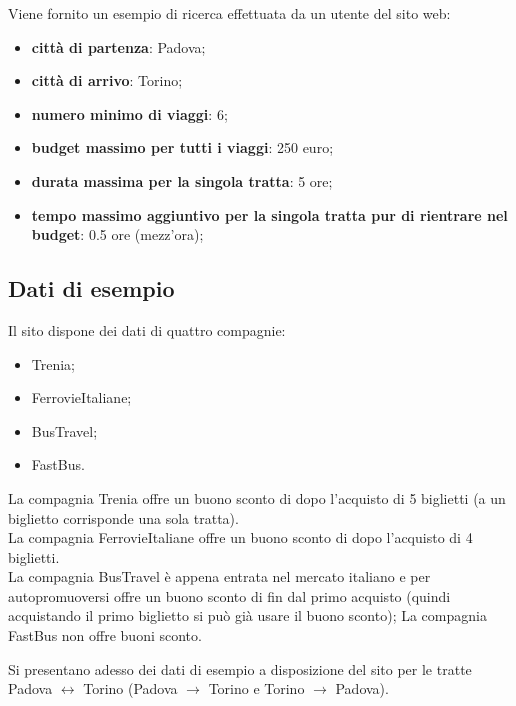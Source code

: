 \documentclass[main.tex]{subfiles}
\begin{document}
Viene fornito un esempio di ricerca effettuata da un utente del sito web:
\begin{itemize}
    \item \textbf{città di partenza}: Padova;
    \item \textbf{città di arrivo}: Torino;
    \item \textbf{numero minimo di viaggi}: 6;
    \item \textbf{budget massimo per tutti i viaggi}: 250 euro;
    \item \textbf{durata massima per la singola tratta}: 5 ore;
    \item \textbf{tempo massimo aggiuntivo per la singola tratta pur di rientrare nel budget}: 0.5 ore (mezz'ora);
\end{itemize}

\clearpage

\subsection{Dati di esempio}
Il sito dispone dei dati di quattro compagnie:
\begin{itemize}
    \item Trenia;
    \item FerrovieItaliane;
    \item BusTravel;
    \item FastBus.
\end{itemize}
La compagnia Trenia offre un buono sconto di  dopo l'acquisto di 5 biglietti (a un biglietto corrisponde una sola tratta).\\
La compagnia FerrovieItaliane offre un buono sconto di  dopo l'acquisto di 4 biglietti.\\
La compagnia BusTravel è appena entrata nel mercato italiano e per autopromuoversi offre un buono sconto di  fin dal primo acquisto (quindi acquistando il primo biglietto si può già usare il buono sconto);
La compagnia FastBus non offre buoni sconto.

Si presentano adesso dei dati di esempio a disposizione del sito per le tratte Padova $\leftrightarrow$ Torino (Padova $\rightarrow$ Torino e Torino $\rightarrow$ Padova).
\end{document}
